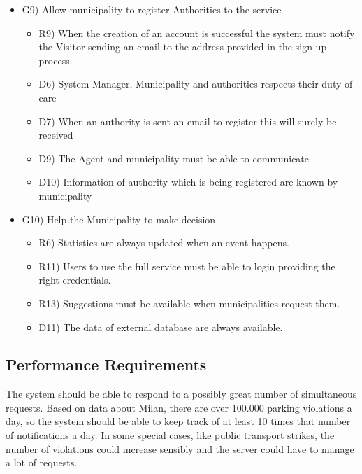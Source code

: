 \begin{itemize}
\begin{itemize}
\end{itemize}
\item G9) Allow municipality to register Authorities to the service
\begin{itemize}
\item R9) When the creation of an account is successful the system must notify the Visitor sending an
email to the address provided in the sign up process.
\item D6) System Manager, Municipality and authorities respects their duty of care
\item D7) When an authority is sent an email to register this will surely be received
\item D9) The Agent and municipality must be able to communicate
\item D10) Information of authority which is being registered are known by municipality
\end{itemize}
\item G10) Help the Municipality to make decision 
\begin{itemize}
\item R6) Statistics are always updated when an event happens.
\item R11) Users to use the full service must be able to login providing the right credentials.
\item R13) Suggestions must be available when municipalities request them.
\item D11) The data of external database are always available.
\end{itemize}
\end{itemize}

\subsection{Performance Requirements}
The system should be able to respond to a possibly great number of simultaneous requests. Based on 
data about Milan, there are over 100.000 parking violations a day, so the system should be able to keep 
track of at least 10 times that number of notifications a day. In some special cases, like public transport 
strikes, the number of violations could increase sensibly and the server could have to manage a lot of 
requests.

